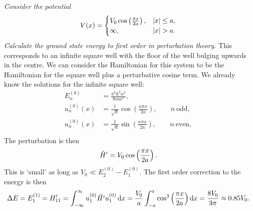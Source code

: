     \begin{example}
        \textit{Consider the potential}
        \[
            V(x) =
            \begin{cases}
                V_0\cos\left(\frac{\pi x}{2a}\right), & \abs{x} \le a,\\
                \infty, & \abs{x} > a.
            \end{cases}
        \]
        \textit{Calculate the ground state energy to first order in perturbation theory.}
        This corresponds to an infinite square well with the floor of the well bulging upwards in the centre.
        We can consider the Hamiltonian for this system to be the Hamiltonian for the square well plus a perturbative cosine term.
        We already know the solutions for the infinite square well:
        \begin{align*}
            E_n^{(0)} &= \frac{\pi^2\hbar^2n^2}{8ma^2},\\
            u_n^{(0)}(x) &= \frac{1}{\sqrt{a}}\cos\left(\frac{n\pi x}{2a}\right), \qquad n~\text{odd},\\
            u_n^{(0)}(x) &= \frac{1}{\sqrt{a}}\sin\left(\frac{n\pi x}{2a}\right), \qquad n~\text{even},\\
        \end{align*}
        The perturbation is then
        \[\hat{H}' = V_0\cos\left(\frac{\pi x}{2a}\right).\]
        This is `small' as long as \(V_0 \ll E_2^{(0)} - E_1^{(0)}\).
        The first order correction to the energy is then
        \[\Delta E = E_1^{(1)} = H'_{11} = \int_{-\infty}^{\infty} u_1^{(0)}\hat{H'}u_1^{(0)}\dd{x} = \frac{V_0}{a} \int_{-a}^{a} \cos^3\left(\frac{\pi x}{2a}\right) \dd{x} = \frac{8V_0}{3\pi} \approx 0.85V_0.\]
    \end{example}
    
